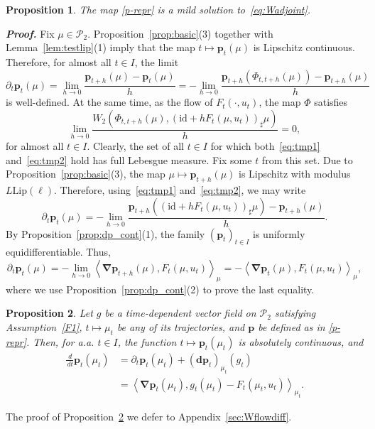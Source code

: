 \documentclass[sn-mathphys-num]{sn-jnl}
\numberwithin{equation}{section}
\theoremstyle{mythm}
\newtheorem{proposition}{Proposition}[section]
\theoremstyle{mydef}
\renewenvironment{proof}{\smallskip\noindent\emph{\textbf{Proof.}}%
  \hspace{1pt}}{\hspace{-5pt}{\nobreak\quad\nobreak\hfill\nobreak%
    $\square$\vspace{2pt}\par}\smallskip\goodbreak}
\newcommand{\Lip}{\mathrm{Lip}}
\renewcommand{\d}{\,d}
\newcommand{\id}{\mathrm{id}}
\renewcommand{\mathbf}[1]{\bm{#1}}
\begin{document}
\begin{proposition}\label{lem:psol}
  The map \eqref{p-repr} is a mild solution to~\eqref{eq:Wadjoint}.
\end{proposition}
\begin{proof}
  Fix \( \mu\in \mathcal{P}_2 \).
  Proposition~\ref{prop:basic}(3) together with Lemma~\ref{lem:testlip}(1) imply that the map \( t\mapsto \mathbf{p}_t(\mu) \) is Lipschitz continuous.
  Therefore, for almost all \( t\in I \), the limit
  \begin{equation}
    \label{eq:tmp1}
    \partial_t \mathbf{p}_t(\mu) = \lim_{h\to 0}\frac{ \mathbf{p}_{t+h}(\mu) - \mathbf{p}_t(\mu)}{h}=-\lim_{h\to 0}\frac{\mathbf{p}_{t+h}(\Phi_{t,t+h}(\mu)) - \mathbf{p}_{t+h}(\mu)}{h}
  \end{equation}
  is well-defined.  
  At the same time, as the flow of \( F_t(\cdot, u_t) \), the map \( \Phi \) satisfies
  \begin{equation}
    \label{eq:tmp2}
   \lim_{h\to 0}\frac{W_2\left(\Phi_{t,t+h}(\mu), (\id +h F_t(\mu,u_t))_{\sharp}\mu\right)}{h} = 0,
  \end{equation}
  for almost all \( t\in I \).  
  Clearly, the set of all \( t\in I \) for which both~\eqref{eq:tmp1} and~\eqref{eq:tmp2} hold has full Lebesgue measure. Fix some \( t \) from this set.
  Due to Proposition~\ref{prop:basic}(3), the map \( \mu \mapsto \mathbf{p}_{t+h}(\mu) \) is Lipschitz with modulus \( L\Lip(\ell) \). 
  Therefore, using~\eqref{eq:tmp1} and~\eqref{eq:tmp2}, we may write 
  \[
    \partial_t \mathbf{p}_t(\mu) =-\lim_{h\to 0}\frac{\mathbf{p}_{t+h}\left((\id +h F_t(\mu,u_t))_{\sharp}\mu\right) - \mathbf{p}_{t+h}(\mu)}{h}.
  \]
  By Proposition~\ref{prop:dp_cont}(1), the family \( (\mathbf{p}_{t})_{t \in I} \) is uniformly equidifferentiable. 
  Thus,
  \[
    \partial_t \mathbf{p}_t(\mu) =-\lim_{h\to 0}\left< \bm \nabla \mathbf{p}_{t+h}(\mu), F_t(\mu,u_t) \right>_{\mu} = -\left< \bm \nabla \mathbf{p}_{t}(\mu), F_t(\mu,u_t) \right>_{\mu},
  \]
  where we use Proposition~\ref{prop:dp_cont}(2) to prove the last equality.
\end{proof}
\begin{proposition}
  \label{prop:sysdif}
  Let \( g \) be a time-dependent vector field on \( \mathcal{P}_2 \) satisfying Assumption~\ref{F1}, \( t\mapsto \mu_t \) be any of its trajectories, and \( \bm p \) be defined as in \eqref{p-repr}.
  Then, for a.a. \( t\in I \), the function \( t\mapsto \bm p_t(\mu_t) \) is absolutely continuous, and
  \begin{align}
    \frac{\d}{\d{t}} \bm p_t(\mu_t)
    &=\partial_t \bm p_t(\mu_t) + (\mathbf{d} \bm p_t)_{\mu_t}(g_t)\nonumber\\
    &=\left< \bm \nabla \bm p_t(\mu_t),g_t(\mu_t) - F_t(\mu_t,u_t)\right>_{\mu_t}.\label{der-pmu}
  \end{align}
\end{proposition}
The proof of Proposition~\ref{prop:sysdif} we defer to Appendix~\ref{sec:Wflowdiff}.
\end{document}

